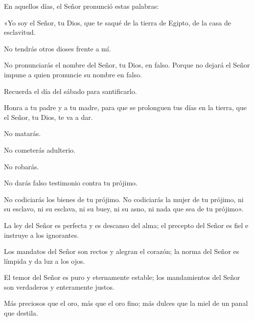 
 


\begin{scripture}
	En aquellos días, el Señor pronunció estas palabras:
	
	«Yo soy el Señor, tu Dios, que te saqué de la tierra de Egipto, de la casa de esclavitud.
	
	No tendrás otros dioses frente a mí.
	
	No pronunciarás el nombre del Señor, tu Dios, en falso. Porque no dejará el Señor impune a quien pronuncie su nombre en falso.
	
	Recuerda el día del sábado para santificarlo. 
	
	Honra a tu padre y a tu madre, para que se prolonguen tus días en la tierra, que el Señor, tu Dios, te va a dar.
	
	No matarás.
	
	No cometerás adulterio.
	
	No robarás.
	
	No darás falso testimonio contra tu prójimo.
	
	No codiciarás los bienes de tu prójimo. No codiciarás la mujer de tu prójimo, ni su esclavo, ni su esclava, ni su buey, ni su asno, ni nada que sea de tu prójimo».
\end{scripture}


\newpage
{}

 


\begin{psbody}
La ley del Señor es perfecta
y es descanso del alma;
el precepto del Señor es fiel
e instruye a los ignorantes. 

Los mandatos del Señor son rectos
y alegran el corazón;
la norma del Señor es límpida
y da luz a los ojos. 

El temor del Señor es puro
y eternamente estable;
los mandamientos del Señor son verdaderos
y enteramente justos. 

Más preciosos que el oro,
más que el oro fino;
más dulces que la miel
de un panal que destila. 
\end{psbody}



